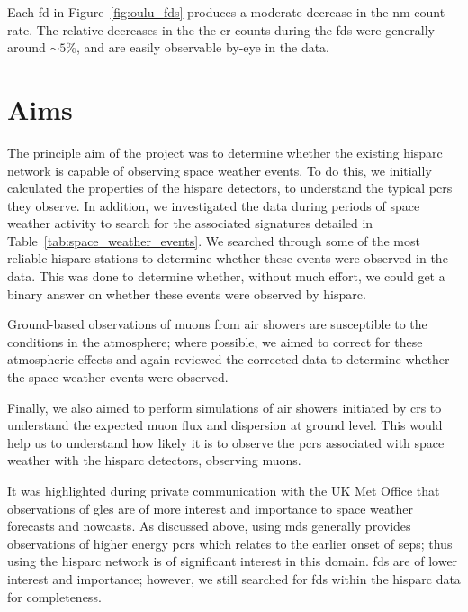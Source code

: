 Each \gls{fd} in Figure~\ref{fig:oulu_fds} produces a moderate decrease in the \gls{nm} count rate. The relative decreases in the the \gls{cr} counts during the \glspl{fd} were generally around $\sim 5\%$, and are easily observable by-eye in the data.





\section{Aims}\label{sec:HS_aims}


The principle aim of the project was to determine whether the existing \gls{hisparc} network is capable of observing space weather events. To do this, we initially calculated the properties of the \gls{hisparc} detectors, to understand the typical \glspl{pcr} they observe. In addition, we investigated the data during periods of space weather activity to search for the associated signatures detailed in Table~\ref{tab:space_weather_events}. We searched through some of the most reliable \gls{hisparc} stations to determine whether these events were observed in the data. This was done to determine whether, without much effort, we could get a binary answer on whether these events were observed by \gls{hisparc}.

Ground-based observations of muons from air showers are susceptible to the conditions in the atmosphere; where possible, we aimed to correct for these atmospheric effects and again reviewed the corrected data to determine whether the space weather events were observed.

Finally, we also aimed to perform simulations of air showers initiated by \glspl{cr} to understand the expected muon flux and dispersion at ground level. This would help us to understand how likely it is to observe the \glspl{pcr} associated with space weather with the \gls{hisparc} detectors, observing muons.

It was highlighted during private communication with the UK Met Office that observations of \glspl{gle} are of more interest and importance to space weather forecasts and nowcasts. As discussed above, using \glspl{md} generally provides observations of higher energy \glspl{pcr} which relates to the earlier onset of \glspl{sep}; thus using the \gls{hisparc} network is of significant interest in this domain. \glspl{fd} are of lower interest and importance; however, we still searched for \glspl{fd} within the \gls{hisparc} data for completeness. 


